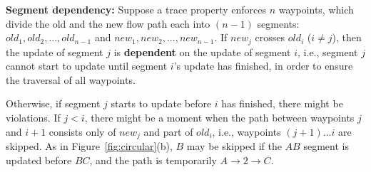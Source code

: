 

  \vspace{-0.1in}
\begin{definition} 
{\bf Segment dependency:}
Suppose a trace property enforces $n$ waypoints, 
which divide the old and the new flow path each into $(n - 1)$ segments:
$old_1, old_2, ..., old_{n - 1}$ and $new_1, new_2, ..., new_{n - 1}$.
If $new_j$ crosses $old_i$ ($i \ne j$), then the update of segment $j$ is 
{\bf dependent} on the update of segment $i$, 
i.e., segment $j$ cannot start to update until segment $i$'s update has finished,
in order to ensure the traversal of all waypoints. 
\end{definition}
  \vspace{-0.1in}

Otherwise, if segment $j$ starts to update before $i$ has finished, there might be
violations. If $j < i$, there might be a moment when the path between waypoints $j$
and $i+1$ consists only of $new_j$ and part of $old_i$, i.e., waypoints $(j+1)
... i$ are skipped. As in Figure~\ref{fig:circular}(b), $B$ may be skipped
if the $AB$ segment is updated before $BC$, and the path is temporarily $A \rightarrow 2 \rightarrow C$. 

